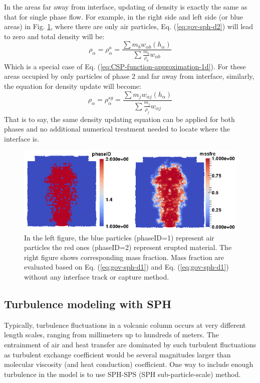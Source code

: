 \documentclass[journal abbreviation, manuscript]{copernicus}
\begin{document}
In the areas far away from interface, updating of density is exactly the same as that for single phase flow. For example, in the right side and left side (or blue areas) in Fig. \ref{fig:SPH-multiple-density}, where there are only air particles, Eq.  (\ref{eq:gov-sph-d2}) will lead to zero and total density will be:
\begin{equation}
\rho_{\alpha}=\rho_{\alpha}^a=\frac{\sum m_b w_{\alpha b} (h_{\alpha})}{\sum \frac{m_b}{\rho_b} w_{\alpha b}}
\end{equation}
Which is a special case of Eq. (\ref{eq:CSP-function-approximation-1d}). For these areas occupied by only particles of phase 2 and far away from interface, similarly, the equation for density update will become: 
\begin{equation}
\rho_{\alpha}=\rho_{\alpha}^{sg}=\frac{\sum m_j w_{\alpha j} (h_{\alpha})}{\sum \frac{m_j}{\rho_j} w_{\alpha j}}
\end{equation}
That is to say, the same density updating equation can be applied for both phases and no additional numerical treatment needed to locate where the interface is.

\begin{figure}
\includegraphics[width=12cm]{Interface.png}
\caption{In the left figure, the blue particles (phaseID=1) represent air particles the red ones (phaseID=2) represent erupted material. The right figure shows corresponding mass fraction. Mass fraction are evaluated based on Eq. (\ref{eq:gov-sph-d1}) and Eq. (\ref{eq:gov-sph-d1}) without any interface track or capture method.}
\label{fig:SPH-multiple-density}
\end{figure}

\subsection{Turbulence modeling with SPH}
Typically, turbulence fluctuations in a volcanic column occurs at very different length scales, ranging from millimeters up to hundreds of meters. The entrainment of air and heat transfer are dominated by such turbulent fluctuations as turbulent exchange coefficient would be several magnitudes larger than molecular viscosity (and heat conduction) coefficient. One way to include enough turbulence in the model is to use SPH-SPS (SPH sub-particle-scale) method.
\end{document}
